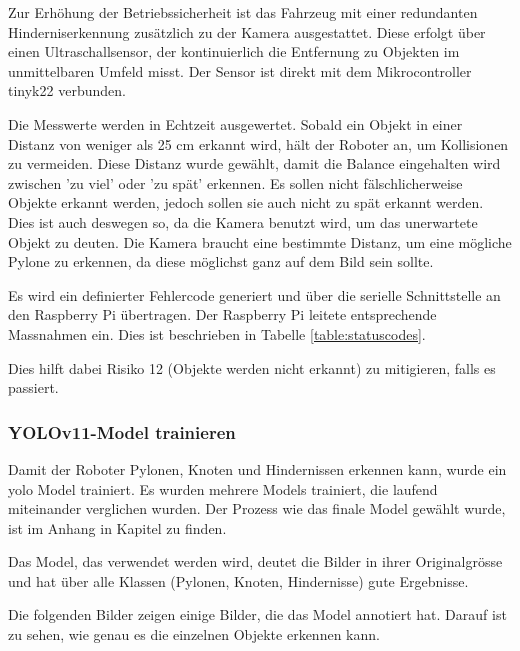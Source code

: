 Zur Erhöhung der Betriebssicherheit ist das Fahrzeug mit einer redundanten Hinderniserkennung zusätzlich zu der Kamera ausgestattet. Diese erfolgt über einen Ultraschallsensor, der kontinuierlich die Entfernung zu Objekten im unmittelbaren Umfeld misst. Der Sensor ist direkt mit dem Mikrocontroller \gls{tinyk22} verbunden.

Die Messwerte werden in Echtzeit ausgewertet. Sobald ein Objekt in einer Distanz von weniger als 25 cm erkannt wird, hält der Roboter an, um Kollisionen zu vermeiden. Diese Distanz wurde gewählt, damit die Balance eingehalten wird zwischen 'zu viel' oder 'zu spät' erkennen. Es sollen nicht fälschlicherweise Objekte erkannt werden, jedoch sollen sie auch nicht zu spät erkannt werden. Dies ist auch deswegen so, da die Kamera benutzt wird, um das unerwartete Objekt zu deuten. Die Kamera braucht eine bestimmte Distanz, um eine mögliche Pylone zu erkennen, da diese möglichst ganz auf dem Bild sein sollte.

Es wird ein definierter Fehlercode generiert und über die serielle Schnittstelle an den Raspberry Pi übertragen. Der Raspberry Pi leitete entsprechende Massnahmen ein. Dies ist beschrieben in Tabelle \ref{table:statuscodes}.

Dies hilft dabei Risiko 12 (Objekte werden nicht erkannt) zu mitigieren, falls es passiert.



\subsubsection{YOLOv11-Model trainieren}

Damit der Roboter Pylonen, Knoten und Hindernissen erkennen kann, wurde ein \gls{yolo} Model trainiert.
Es wurden mehrere Models trainiert, die laufend miteinander verglichen wurden. Der Prozess wie das finale Model gewählt wurde, ist im Anhang in Kapitel  zu finden.

Das Model, das verwendet werden wird, deutet die Bilder in ihrer Originalgrösse und hat über alle Klassen (Pylonen, Knoten, Hindernisse) gute Ergebnisse.

Die folgenden Bilder zeigen einige Bilder, die das Model annotiert hat. Darauf ist zu sehen, wie genau es die einzelnen Objekte erkennen kann.

